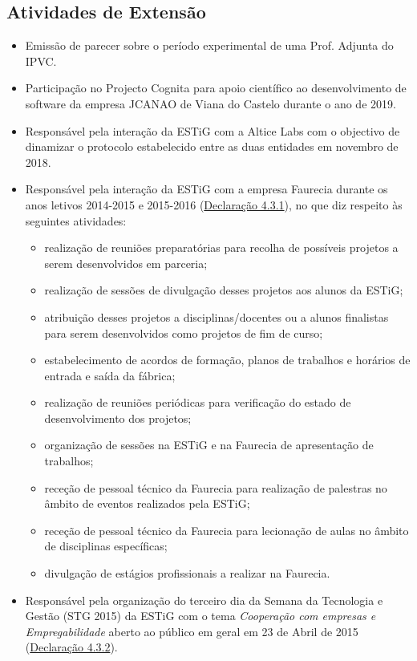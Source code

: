 \documentclass[11pt]{article}
\begin{document}
\subsection{Atividades de Extensão}
\begin{itemize}
\item {Emissão de parecer sobre o período experimental de uma Prof. Adjunta do IPVC.}
\item {Participação no Projecto Cognita para apoio científico ao desenvolvimento de software da empresa JCANAO de Viana do Castelo durante o ano de 2019.}
\item {Responsável pela interação da ESTiG com a Altice Labs com o objectivo de dinamizar o protocolo estabelecido entre as duas entidades em novembro de 2018.}
\item {Responsável pela interação da ESTiG com a empresa Faurecia durante os anos letivos 2014-2015 e
2015-2016 (\href{run:MissaoIPBoutros/FAURECIA.pdf}{Declaração 4.3.1}), no que diz respeito às seguintes atividades:}
\begin{itemize}
\item {realização de reuniões preparatórias para recolha de possíveis projetos a serem desenvolvidos em parceria;}
\item {realização de sessões de divulgação desses projetos aos alunos da ESTiG;}
\item {atribuição desses projetos a disciplinas/docentes ou a alunos finalistas para serem desenvolvidos como projetos de fim de curso;}
\item {estabelecimento de acordos de formação, planos de trabalhos e horários de entrada e saída da fábrica;}
\item {realização de reuniões periódicas para verificação do estado de desenvolvimento dos projetos;}
\item {organização de sessões na ESTiG e na Faurecia de apresentação de trabalhos;}
\item {receção de pessoal técnico da Faurecia para realização de palestras no âmbito de eventos realizados pela ESTiG;}
\item {receção de pessoal técnico da Faurecia para lecionação de aulas no âmbito de disciplinas específicas;}
\item {divulgação de estágios profissionais a realizar na Faurecia.}
\end{itemize}
\item {Responsável pela organização do terceiro dia da Semana da Tecnologia e Gestão (STG 2015) da ESTiG com o tema {\em{ Cooperação com empresas e Empregabilidade}} aberto ao público em geral em 23 de Abril de 2015 (\href{run:MissaoIPBoutros/STG2015.pdf}{Declaração 4.3.2}).}
\end{itemize}
\end{document}
